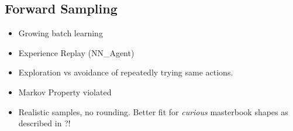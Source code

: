 \subsection{Forward Sampling}
\begin{itemize}
\item Growing batch learning
\item Experience Replay (NN\_Agent)
\item Exploration vs avoidance of repeatedly trying same actions.
\item Markov Property violated
\item Realistic samples, no rounding. Better fit for \emph{curious} masterbook shapes as described in ?!
\end{itemize}







